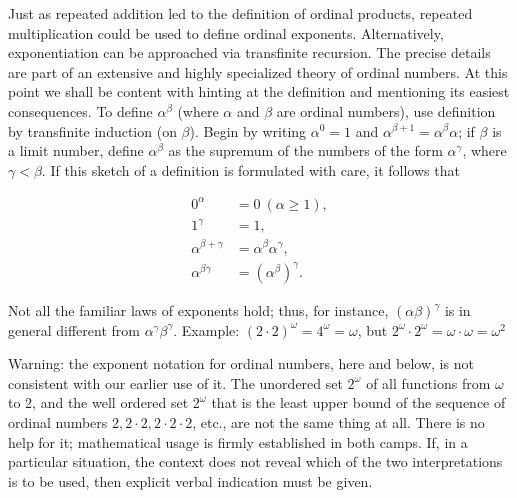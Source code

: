 Just as repeated addition led to the definition of ordinal products, repeated multiplication could be used to define ordinal exponents. Alternatively, exponentiation can be approached via transfinite recursion. The precise details are part of an extensive and highly specialized theory of ordinal numbers. At this point we shall be content with hinting at the definition and mentioning its easiest consequences. To define $\alpha^{\beta}$ (where $\alpha$ and $\beta$ are ordinal numbers), use definition by transfinite induction (on $\beta$). Begin by writing $\alpha^{0} = 1$ and $\alpha^{\beta + 1} = \alpha^{\beta} \alpha$; if $\beta$ is a limit number, define $\alpha^{\beta}$ as the supremum of the numbers of the form $\alpha^{\gamma}$, where $\gamma < \beta$. If this sketch of a definition is formulated with care, it follows that

\begin{align*}
0^{\alpha} &= 0\ (\alpha \ge 1),\\
1^{\gamma} &= 1,\\
\alpha^{\beta + \gamma} &= \alpha^{\beta} \alpha^{\gamma} ,\\
\alpha^{\beta \gamma} &= (\alpha^{\beta})^{\gamma}.
\end{align*}

Not all the familiar laws of exponents hold; thus, for instance, $( \alpha \beta)^{\gamma}$ is in general different from $\alpha^{\gamma} \beta^{\gamma}$. Example: $(2 \cdot 2)^{\omega} = 4^{\omega} = \omega$, but $2^{\omega} \cdot 2^{\omega} = \omega \cdot \omega =  \omega^{2}$ 

Warning: the exponent notation for ordinal numbers, here and below, is not consistent with our earlier use of it. The unordered set $2^{\omega}$ of all functions from $\omega$ to $2$, and the well ordered set $2^{\omega}$ that is the least upper bound of the sequence of ordinal numbers $2, 2 \cdot 2, 2 \cdot 2 \cdot 2$, etc., are not the same thing at all. There is no help for it; mathematical usage is firmly established in both camps. If, in a particular situation, the context does not reveal which of the two interpretations is to be used, then explicit verbal indication must be given. 